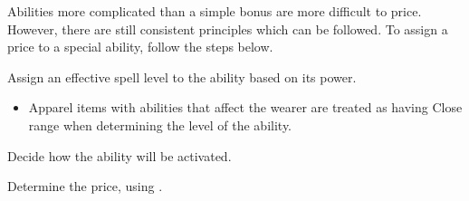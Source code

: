 Abilities more complicated than a simple bonus are more difficult to price. However, there are still consistent principles which can be followed. To assign a price to a special ability, follow the steps below.
\begin{enumerate*}
    \item Assign an effective spell level to the ability based on its power.
        \begin{itemize}
            \item Apparel items with abilities that affect the wearer are treated as having Close range when determining the level of the ability.
        \end{itemize}
    \item Decide how the ability will be activated.
    \item Determine the price, using .
\end{enumerate*}

